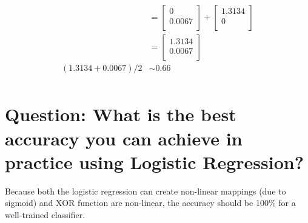 \documentclass[addpoints]{exam}
\begin{document}
\begin{align*}
        &= \begin{bmatrix}
            0\\
            0.0067\\
        \end{bmatrix}+\begin{bmatrix}
            1.3134\\
            0\\
        \end{bmatrix}\\
        &= \begin{bmatrix}
            1.3134\\
            0.0067\\
        \end{bmatrix}\\
        (1.3134+0.0067)/2 & \sim 0.66\\
    \end{align*}
    \section*{Question: What is the best accuracy you can achieve in practice using Logistic Regression?}
    Because both the logistic regression can create non-linear mappings (due to sigmoid) and XOR function are non-linear, the accuracy should be 100\% for a well-trained classifier.
\end{document}
